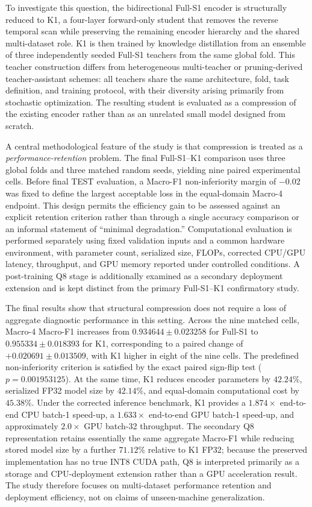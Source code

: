 To investigate this question, the bidirectional Full-S1 encoder is structurally reduced to K1, a four-layer forward-only student that removes the reverse temporal scan while preserving the remaining encoder hierarchy and the shared multi-dataset role. K1 is then trained by knowledge distillation from an ensemble of three independently seeded Full-S1 teachers from the same global fold. This teacher construction differs from heterogeneous multi-teacher or pruning-derived teacher-assistant schemes: all teachers share the same architecture, fold, task definition, and training protocol, with their diversity arising primarily from stochastic optimization. The resulting student is evaluated as a compression of the existing encoder rather than as an unrelated small model designed from scratch.

A central methodological feature of the study is that compression is treated as a \emph{performance-retention} problem. The final Full-S1--K1 comparison uses three global folds and three matched random seeds, yielding nine paired experimental cells. Before final TEST evaluation, a Macro-F1 non-inferiority margin of $-0.02$ was fixed to define the largest acceptable loss in the equal-domain Macro-4 endpoint. This design permits the efficiency gain to be assessed against an explicit retention criterion rather than through a single accuracy comparison or an informal statement of ``minimal degradation.'' Computational evaluation is performed separately using fixed validation inputs and a common hardware environment, with parameter count, serialized size, FLOPs, corrected CPU/GPU latency, throughput, and GPU memory reported under controlled conditions. A post-training Q8 stage is additionally examined as a secondary deployment extension and is kept distinct from the primary Full-S1--K1 confirmatory study.

The final results show that structural compression does not require a loss of aggregate diagnostic performance in this setting. Across the nine matched cells, Macro-4 Macro-F1 increases from $0.934644\pm0.023258$ for Full-S1 to $0.955334\pm0.018393$ for K1, corresponding to a paired change of $+0.020691\pm0.013509$, with K1 higher in eight of the nine cells. The predefined non-inferiority criterion is satisfied by the exact paired sign-flip test ($p=0.001953125$). At the same time, K1 reduces encoder parameters by $42.24\%$, serialized FP32 model size by $42.14\%$, and equal-domain computational cost by $45.38\%$. Under the corrected inference benchmark, K1 provides a $1.874\times$ end-to-end CPU batch-1 speed-up, a $1.633\times$ end-to-end GPU batch-1 speed-up, and approximately $2.0\times$ GPU batch-32 throughput. The secondary Q8 representation retains essentially the same aggregate Macro-F1 while reducing stored model size by a further $71.12\%$ relative to K1 FP32; because the preserved implementation has no true INT8 CUDA path, Q8 is interpreted primarily as a storage and CPU-deployment extension rather than a GPU acceleration result. The study therefore focuses on multi-dataset performance retention and deployment efficiency, not on claims of unseen-machine generalization.

